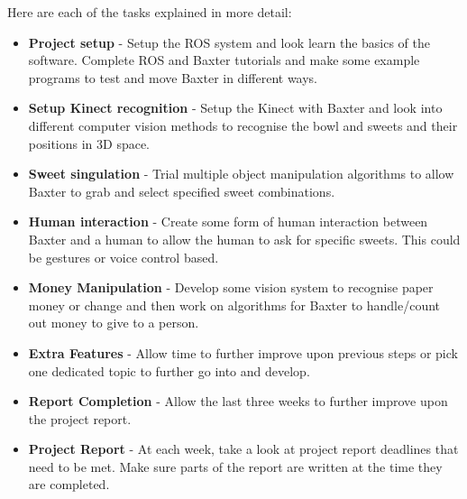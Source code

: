 Here are each of the tasks explained in more detail:\newline
\begin{itemize}
\item{\textbf{Project setup} - Setup the ROS system and look learn the basics of the software. Complete ROS and Baxter tutorials and make some example programs to test and move Baxter in different ways.}
\item{\textbf{Setup Kinect recognition} - Setup the Kinect with Baxter and look into different computer vision methods to recognise the bowl and sweets and their positions in 3D space.}
\item{\textbf{Sweet singulation} - Trial multiple object manipulation algorithms to allow Baxter to grab and select specified sweet combinations.}
\item{\textbf{Human interaction} - Create some form of human interaction between Baxter and a human to allow the human to ask for specific sweets. This could be gestures or voice control based.}
\item{\textbf{Money Manipulation} - Develop some vision system to recognise paper money or change and then work on algorithms for Baxter to handle/count out money to give to a person.}
\item{\textbf{Extra Features} - Allow time to further improve upon previous steps or pick one dedicated topic to further go into and develop.}
\item{\textbf{Report Completion} - Allow the last three weeks to further improve upon the project report.}
\item{\textbf{Project Report} - At each week, take a look at project report deadlines that need to be met. Make sure parts of the report are written at the time they are completed.}
\end{itemize}
